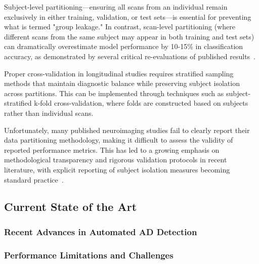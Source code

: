 \documentclass[12pt, a4paper]{article}
\begin{document}
Subject-level partitioning—ensuring all scans from an individual remain exclusively in either training, validation, or test sets—is essential for preventing what is termed "group leakage." In contrast, scan-level partitioning (where different scans from the same subject may appear in both training and test sets) can dramatically overestimate model performance by 10-15\% in classification accuracy, as demonstrated by several critical re-evaluations of published results~\cite{davatzikos2019machine}.

Proper cross-validation in longitudinal studies requires stratified sampling methods that maintain diagnostic balance while preserving subject isolation across partitions. This can be implemented through techniques such as subject-stratified k-fold cross-validation, where folds are constructed based on subjects rather than individual scans.

Unfortunately, many published neuroimaging studies fail to clearly report their data partitioning methodology, making it difficult to assess the validity of reported performance metrics. This has led to a growing emphasis on methodological transparency and rigorous validation protocols in recent literature, with explicit reporting of subject isolation measures becoming standard practice~\cite{davatzikos2019machine}.

\subsection{Current State of the Art}

\subsubsection{Recent Advances in Automated AD Detection}


\subsubsection{Performance Limitations and Challenges}
\end{document}
